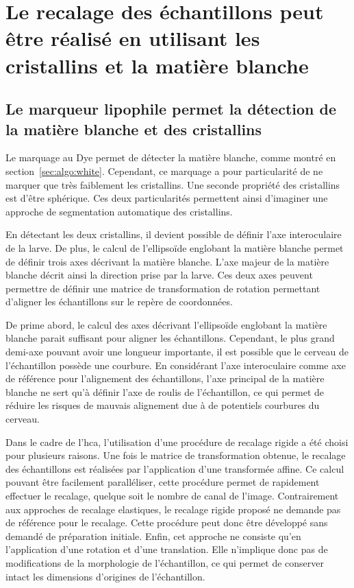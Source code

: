 \documentclass[\main/main.tex]{subfiles}
\begin{document}
\section{\label{sec:algo:recalage}Le recalage des échantillons peut être réalisé en utilisant les cristallins et la matière blanche
}

\subsection{Le marqueur lipophile permet la détection de la matière blanche et des cristallins}

%
Le marquage au Dye permet de détecter la matière blanche, comme montré en section~\ref{sec:algo:white}.
%
Cependant, ce marquage a pour particularité de ne marquer que très faiblement les cristallins.
%
Une seconde propriété des cristallins est d'être sphérique.
%
Ces deux particularités permettent ainsi d'imaginer une approche de segmentation automatique des cristallins.
%

%
En détectant les deux cristallins, il devient possible de définir l'axe interoculaire de la larve.
%
De plus, le calcul de l'ellipsoïde englobant la matière blanche permet de définir trois axes décrivant la matière blanche.
%
L'axe majeur de la matière blanche décrit ainsi la direction prise par la larve.
%
Ces deux axes peuvent permettre de définir une matrice de transformation de rotation permettant d'aligner les échantillons sur le repère de coordonnées.

%
De prime abord, le calcul des axes décrivant l'ellipsoïde englobant la matière blanche parait suffisant pour aligner les échantillons.
%
Cependant, le plus grand demi-axe pouvant avoir une longueur importante, il est possible que le cerveau de l'échantillon possède une courbure.
%
En considérant l'axe interoculaire comme axe de référence pour l'alignement des échantillons, l'axe principal de la matière blanche ne sert qu'à définir l'axe de roulis de l'échantillon, ce qui permet de réduire les risques de mauvais alignement due à de potentiels courbures du cerveau.

%
Dans le cadre de l'hca{}, l'utilisation d'une procédure de recalage rigide a été choisi pour plusieurs raisons.
%
Une fois le matrice de transformation obtenue, le recalage des échantillons est réalisées par l'application d'une transformée affine.
%
Ce calcul pouvant être facilement paralléliser, cette procédure permet de rapidement effectuer le recalage, quelque soit le nombre de canal de l'image.
%
Contrairement aux approches de recalage elastiques, le recalage rigide proposé ne demande pas de référence pour le recalage.
%
Cette procédure peut donc être développé sans demandé de préparation initiale.
%
Enfin, cet approche ne consiste qu'en l'application d'une rotation et d'une translation.
%
Elle n'implique donc pas de modifications de la morphologie de l'échantillon, ce qui permet de conserver intact les dimensions d'origines de l'échantillon.
\end{document}
